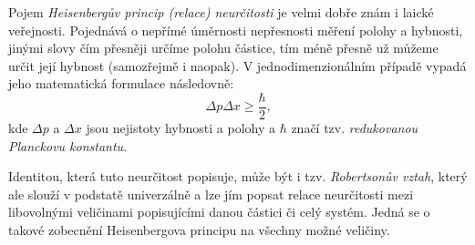 \documentclass{../../../../style/mkimain}
\begin{document}
\noindent{}
\klein
Pojem \emph{Heisenbergův princip (relace) neurčitosti} je velmi dobře znám i laické veřejnosti.
Pojednává o nepřímé úměrnosti nepřesnosti měření polohy a hybnosti, jinými slovy čím přesněji určíme polohu částice,
tím méně přesně už můžeme určit její hybnost (samozřejmě i naopak). V jednodimenzionálním případě vypadá jeho matematická formulace následovně:
$$\Delta p \Delta x \geq \frac{\hbar}{2}\text{,}$$
kde $\Delta p$ a $\Delta x$ jsou nejistoty hybnosti a polohy a $\hbar$ značí tzv. \emph{redukovanou Planckovu konstantu}.

Identitou, která tuto neurčitost popisuje, může být i tzv. \emph{Robertsonův vztah},
který ale slouží v podstatě univerzálně a lze jím popsat relace neurčitosti mezi libovolnými veličinami popisujícími danou částici či celý systém.
Jedná se o takové zobecnění Heisenbergova principu na všechny možné veličiny.
\end{document}
